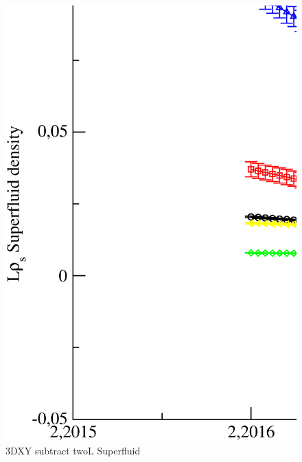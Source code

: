 \begin{figure}[!htpb]
  \centering
  \includegraphics[width=\textwidth]{./plots/3DXY/vsT/subtract_twoL_Superfluid.eps}
  \caption{3DXY subtract twoL Superfluid}
\end{figure}

